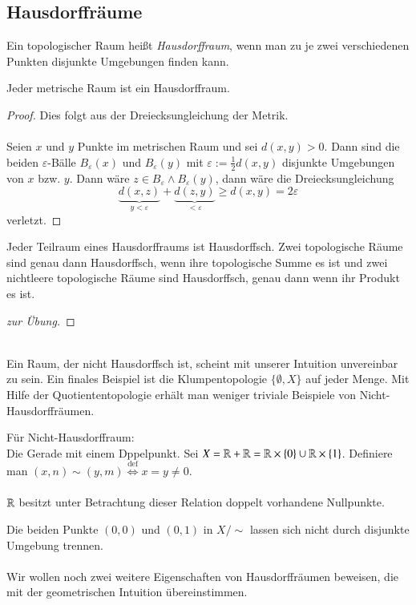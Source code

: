 \documentclass[a4paper,10pt]{scrartcl}
\newcommand{\eps}{\varepsilon}
\begin{document}
\subsection{Hausdorffräume}
\begin{df}
 Ein topologischer Raum heißt \emph{Hausdorffraum}, wenn man zu je zwei verschiedenen Punkten disjunkte Umgebungen finden kann.
\\ \fixme[fig13]
\end{df}
\begin{st}
Jeder metrische Raum ist ein Hausdorffraum. 
\end{st}
\begin{proof}
Dies folgt aus der Dreiecksungleichung der Metrik. \\
 \fixme[fig14] \\
Seien $x$ und $y$ Punkte im metrischen Raum und sei $d(x,y)>0$.
Dann sind die beiden $\eps$-Bälle $B_\eps(x)$ und $B_\eps(y)$ mit $\eps:=\frac{1}{2}d(x,y)$ disjunkte Umgebungen von $x$ bzw. $y$. Dann 
wäre $z\in B_\eps \land B_\eps(y)$, dann wäre die Dreiecksungleichung
\[
\underbrace{d(x,z)}_{y<\eps}+\underbrace{d(z,y)}_{<\eps}\ge d(x,y)=2\eps
\]        
verletzt.
\end{proof}
\begin{st}
Jeder Teilraum eines Hausdorffraums ist Hausdorffsch. Zwei topologische Räume sind genau dann Hausdorffsch, wenn ihre topologische Summe es ist und zwei nichtleere topologische Räume sind Hausdorffsch, genau dann wenn ihr Produkt es ist. 
\end{st}
\begin{proof}[zur Übung]\end{proof}
\fixme[fig15]\\
Ein Raum, der nicht Hausdorffsch ist, scheint mit unserer Intuition unvereinbar zu sein.  Ein finales Beispiel ist die Klumpentopologie $\{\emptyset, X\}$ auf jeder Menge. Mit Hilfe der Quotiententopologie erhält man weniger triviale Beispiele von Nicht-Hausdorffräumen.
\begin{ex*} Für Nicht-Hausdorffraum:\\
Die Gerade mit einem Dppelpunkt. Sei $ X=\mathbb{R}+\mathbb{R}=\mathbb{R}\times \{0\}\cup \mathbb{R}\times \{1\} $. Definiere man $ (x,n)\sim (y,m)\stackrel{\text{def}}{\iff} x=y\neq 0 $. \\
\fixme[fig16]\\
$ \mathbb{R} $ besitzt unter Betrachtung dieser Relation doppelt vorhandene Nullpunkte.

Die beiden Punkte $(0,0)$ und $(0,1)$ in $ X/\sim $ lassen sich nicht durch disjunkte Umgebung trennen.\\
\fixme[fig17]\\
Wir wollen noch zwei weitere Eigenschaften von Hausdorffräumen beweisen, die mit der geometrischen Intuition übereinstimmen.
\end{ex*}
\end{document}
